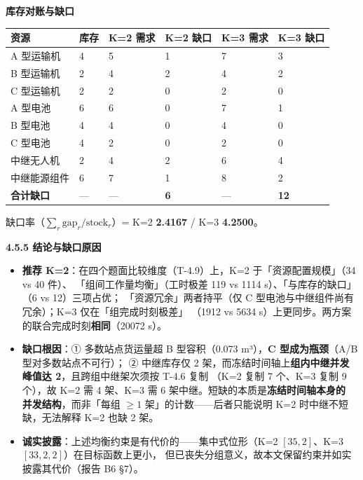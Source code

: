 \documentclass[
  10.5pt,
]{extarticle}
\newcounter{none} %
\providecommand{\tightlist}{%
  \setlength{\itemsep}{0pt}\setlength{\parskip}{0pt}}
\begin{document}
\textbf{库存对账与缺口}

{\def\LTcaptype{none} %
\begin{longtable}[]{@{}llllll@{}}
\toprule\noalign{}
资源 & 库存 & K=2 需求 & K=2 缺口 & K=3 需求 & K=3 缺口 \\
\midrule\noalign{}
\endhead
\bottomrule\noalign{}
\endlastfoot
A 型运输机 & 4 & 5 & 1 & 7 & 3 \\
B 型运输机 & 2 & 4 & 2 & 4 & 2 \\
C 型运输机 & 2 & 2 & 0 & 2 & 0 \\
A 型电池 & 6 & 6 & 0 & 7 & 1 \\
B 型电池 & 4 & 4 & 0 & 4 & 0 \\
C 型电池 & 4 & 2 & 0 & 2 & 0 \\
中继无人机 & 2 & 4 & 2 & 6 & 4 \\
中继能源组件 & 6 & 7 & 1 & 8 & 2 \\
\textbf{合计缺口} & --- & --- & \textbf{6} & --- & \textbf{12} \\
\end{longtable}
}

缺口率（\(\sum_r \text{gap}_r/\text{stock}_r\)）= K=2 \textbf{2.4167} /
K=3 \textbf{4.2500}。

\textbf{4.5.5 结论与缺口原因}

\begin{itemize}
\tightlist
\item
  \textbf{推荐 K=2}：在四个题面比较维度（T-4.9）上，K=2
  于「资源配置规模」（34 vs 40 件）、 「组间工作量均衡」（工时极差 119
  vs 1114 s）、「与库存的缺口」（6 vs 12）三项占优；
  「资源冗余」两者持平（仅 C 型电池与中继组件尚有冗余）；K=3
  仅在「组完成时刻极差」 （1912 vs 5634
  s）上更同步。两方案的联合完成时刻\textbf{相同}（20072 s）。
\item
  \textbf{缺口根因}：① 多数站点货运量超 B 型容积（0.073 m³），\textbf{C
  型成为瓶颈}（A/B 型对多数站点不可行）； ② 中继库存仅 2
  架，而冻结时间轴上\textbf{组内中继并发峰值达 2}，且跨组中继架次须按
  T-4.6 复制 （K=2 复制 7 个、K=3 复制 9 个），故 K=2 需 4 架、K=3 需 6
  架中继。短缺的本质是\textbf{冻结时间轴本身的 并发结构}，而非「每组
  \(\ge 1\) 架」的计数------后者只能说明 K=2 时中继不短缺，无法解释 K=2
  也缺 2 架。
\item
  \textbf{诚实披露}：上述均衡约束是有代价的------集中式位形（K=2
  \([35,2]\)、K=3 \([33,2,2]\)）在目标函数上更小，
  但已丧失分组意义，故本文保留约束并如实披露其代价（报告 B6 §7）。
\end{itemize}
\end{document}
